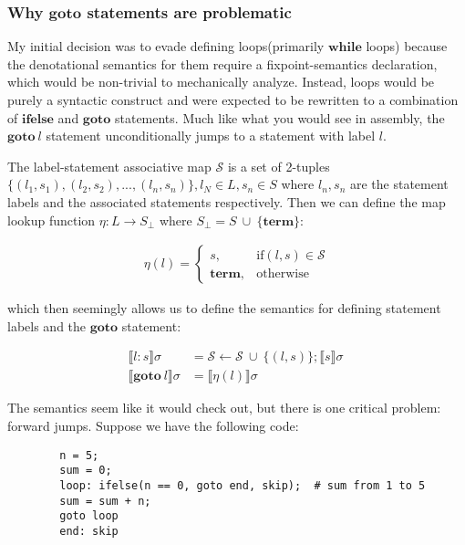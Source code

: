 \documentclass{article}
\begin{document}
	\subsubsection{Why $\mathbf{goto}$ statements are problematic}
	
	My initial decision was to evade defining loops(primarily $\mathbf{while}$ loops) because the denotational semantics for them require a fixpoint-semantics declaration, which would be non-trivial to mechanically analyze. Instead, loops would be purely a syntactic construct and were expected to be rewritten to a combination of $\mathbf{ifelse}$ and $\mathbf{goto}$ statements. Much like what you would see in assembly, the $\mathbf{goto} \ l$ statement unconditionally jumps to a statement with label $l$.
	
	The label-statement associative map $\mathcal{S}$ is a set of 2-tuples $\{ (l_1, s_1), (l_2, s_2), ..., (l_n, s_n) \}, l_N \in L, s_n \in S$ where $l_n, s_n$ are the statement labels and the associated statements respectively. Then we can define the map lookup function $\eta: L \to S_{\bot}$ where $S_{\bot} = S \ \cup \ \{ \mathbf{term} \}$:
	
	
	\begin{align*}
		\eta(l) = 
		\begin{cases}
			s, & \text{if} (l, s) \in \mathcal{S} \\
			\mathbf{term}, & \text{otherwise}
		\end{cases}
	\end{align*}
	
	which then seemingly allows us to define the semantics for defining statement labels and the $\mathbf{goto}$ statement:
	
	\begin{align*}
		\llbracket l: s \rrbracket \sigma &= \mathcal{S} \leftarrow \mathcal{S} \ \cup \ \{ (l, s) \}; \llbracket s \rrbracket \sigma\ \\
		\llbracket \mathbf{goto} \ l \rrbracket \sigma &= \llbracket \eta(l) \rrbracket \sigma
	\end{align*}
	
	The semantics seem like it would check out, but there is one critical problem: forward jumps. Suppose we have the following code:
	
	\begin{verbatim}
		n = 5;
		sum = 0;
		loop: ifelse(n == 0, goto end, skip);  # sum from 1 to 5
		sum = sum + n;
		goto loop
		end: skip
	\end{verbatim}
	
\end{document}
